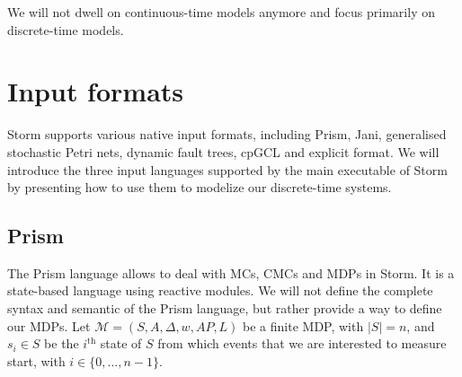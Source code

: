 We will not dwell on continuous-time models anymore and focus primarily on discrete-time models.

\section{Input formats}
Storm supports various native input formats, including Prism, Jani, generalised stochastic Petri nets, dynamic fault trees, cpGCL and explicit format.
We will introduce the three input languages supported by the main executable of Storm by presenting how to use them to modelize our
discrete-time systems.
\subsection{Prism}
The Prism language \cite{prismsynt} allows to deal with MCs, CMCs and MDPs in Storm.
It is a state-based language using reactive modules.
We will not define the complete syntax and semantic of the Prism language, but rather provide a way to
define our MDPs.
Let $\mathcal{M} = (S, A, \Delta, w, AP, L)$ be a finite MDP, with $|S| = n$, and $s_i \in S$ be the $i^{\text{th}}$ state of $S$ from which events that we are
interested to measure start, with $i \in \{0, \dots, n-1\}$. \\

